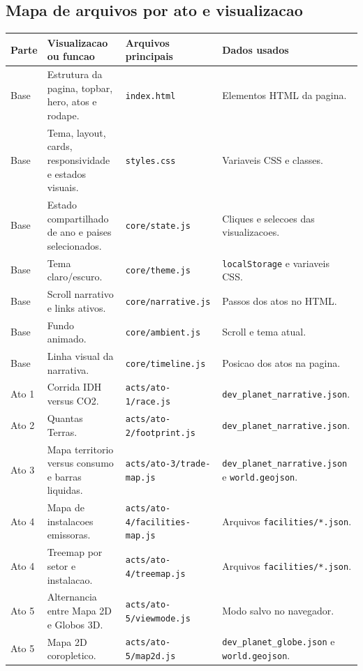 \documentclass[12pt,a4paper]{article}
\begin{document}
\subsection{Mapa de arquivos por ato e visualizacao}

\begin{longtable}{>{\raggedright\arraybackslash}p{2.4cm}>{\raggedright\arraybackslash}p{4.2cm}>{\raggedright\arraybackslash}p{4.5cm}>{\raggedright\arraybackslash}p{3.1cm}}
\toprule
\textbf{Parte} & \textbf{Visualizacao ou funcao} & \textbf{Arquivos principais} & \textbf{Dados usados} \\
\midrule
Base & Estrutura da pagina, topbar, hero, atos e rodape. & \texttt{index.html} & Elementos HTML da pagina. \\
Base & Tema, layout, cards, responsividade e estados visuais. & \texttt{styles.css} & Variaveis CSS e classes. \\
Base & Estado compartilhado de ano e paises selecionados. & \texttt{core/state.js} & Cliques e selecoes das visualizacoes. \\
Base & Tema claro/escuro. & \texttt{core/theme.js} & \texttt{localStorage} e variaveis CSS. \\
Base & Scroll narrativo e links ativos. & \texttt{core/narrative.js} & Passos dos atos no HTML. \\
Base & Fundo animado. & \texttt{core/ambient.js} & Scroll e tema atual. \\
Base & Linha visual da narrativa. & \texttt{core/timeline.js} & Posicao dos atos na pagina. \\
Ato 1 & Corrida IDH versus CO2. & \texttt{acts/ato-1/race.js} & \texttt{dev\_planet\_narrative.json}. \\
Ato 2 & Quantas Terras. & \texttt{acts/ato-2/footprint.js} & \texttt{dev\_planet\_narrative.json}. \\
Ato 3 & Mapa territorio versus consumo e barras liquidas. & \texttt{acts/ato-3/trade-map.js} & \texttt{dev\_planet\_narrative.json} e \texttt{world.geojson}. \\
Ato 4 & Mapa de instalacoes emissoras. & \texttt{acts/ato-4/facilities-map.js} & Arquivos \texttt{facilities/*.json}. \\
Ato 4 & Treemap por setor e instalacao. & \texttt{acts/ato-4/treemap.js} & Arquivos \texttt{facilities/*.json}. \\
Ato 5 & Alternancia entre Mapa 2D e Globos 3D. & \texttt{acts/ato-5/viewmode.js} & Modo salvo no navegador. \\
Ato 5 & Mapa 2D coropletico. & \texttt{acts/ato-5/map2d.js} & \texttt{dev\_planet\_globe.json} e \texttt{world.geojson}. \\

\end{longtable}
\end{document}
